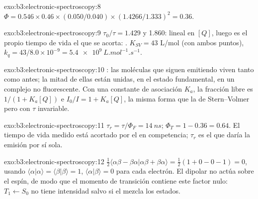 \begin{solution}{exo:b3:electronic-spectroscopy:8}
$\Phi = 0.546 \times 0.46 \times (0.050/0.040) \times (1.4266/1.333)^2 = 0.36$.
\end{solution}

\begin{solution}{exo:b3:electronic-spectroscopy:9}
$\tau_0/\tau = 1.429$ y 1.860: lineal en $[Q]$, luego es el propio tiempo de vida el que se
acorta: . $K_{SV} = 43$ L/mol (con ambos puntos), $k_q = 43/8.0
\times 10^{-9} = \qty{5.4e9}{L.mol^{-1}.s^{-1}}$.
\end{solution}

\begin{solution}{exo:b3:electronic-spectroscopy:10}
: las moléculas que siguen emitiendo viven tanto como antes; la mitad de
ellas están unidas, en el estado fundamental, en un complejo no fluorescente. Con una
constante de asociación $K_a$, la fracción libre es $1/(1 + K_a[Q])$ e $I_0/I = 1 +
K_a[Q]$, la misma forma que la de Stern--Volmer pero con $\tau$ invariable.
\end{solution}

\begin{solution}{exo:b3:electronic-spectroscopy:11}
$\tau_r = \tau/\Phi_F = \qty{14}{ns}$; $\Phi_T = 1 - 0.36 = 0.64$. El tiempo de vida medido está
acortado por el  en competencia; $\tau_r$ es el que daría la emisión
por sí sola.
\end{solution}

\begin{solution}{exo:b3:electronic-spectroscopy:12}
$\frac12\langle\alpha\beta - \beta\alpha|\alpha\beta + \beta\alpha\rangle = \frac12(1 + 0 - 0 - 1) = 0$, usando
$\langle\alpha|\alpha\rangle = \langle\beta|\beta\rangle = 1$, $\langle\alpha|\beta\rangle = 0$ para cada electrón.
El  dipolar no actúa sobre el espín, de modo que el momento de transición contiene este
factor nulo: $T_1 \leftarrow S_0$ no tiene intensidad salvo si el  mezcla
los estados.
\end{solution}

